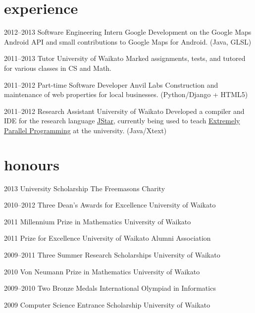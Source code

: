 \documentclass[print]{boris-cv}
\begin{document}
\section{experience}

\begin{entrylist}
  \entry
    {2012--2013}
    {Software Engineering Intern}
    {Google}
    {Development on the Google Maps Android API
    and small contributions to Google Maps for Android. (Java, GLSL)}

  \entry
    {2011--2013}
    {Tutor}
    {University of Waikato}
    {Marked assignments, tests, and tutored
    for various classes in CS and Math.}

  \entry
    {2011--2012}
    {Part-time Software Developer}
    {Anvil Labs}
    {Construction and maintenance of web properties for local businesses.
        (Python/Django + HTML5)}

  \entry
    {2011--2012}
    {Research Assistant}
    {University of Waikato}
    {Developed a compiler and IDE for the research language
    \href{http://www.cs.waikato.ac.nz/research/jstar/}{JStar}, currently being used to teach
    \href{http://papers.waikato.ac.nz/subjects/COMP/COMP553}
    {Extremely Parallel Programming} at the university. (Java/Xtext)}

\end{entrylist}


\section{honours}
\begin{entrylist}
  \titleentry
    {2013}
    {University Scholarship}
    {The Freemasons Charity}

  \titleentry
    {2010--2012}
    {Three Dean's Awards for Excellence}
    {University of Waikato}

  \titleentry
    {2011}
    {Millennium Prize in Mathematics}
    {University of Waikato}

  \titleentry
    {2011}
    {Prize for Excellence}
    {University of Waikato Alumni Association}

  \titleentry
    {2009--2011}
    {Three Summer Research Scholarships}
    {University of Waikato}

  \titleentry
    {2010}
    {Von Neumann Prize in Mathematics}
    {University of Waikato}

  \titleentry
    {2009--2010}
    {Two Bronze Medals}
    {International Olympiad in Informatics}

  \titleentry
    {2009}
    {Computer Science Entrance Scholarship}
    {University of Waikato}
\end{entrylist}
\end{document}
